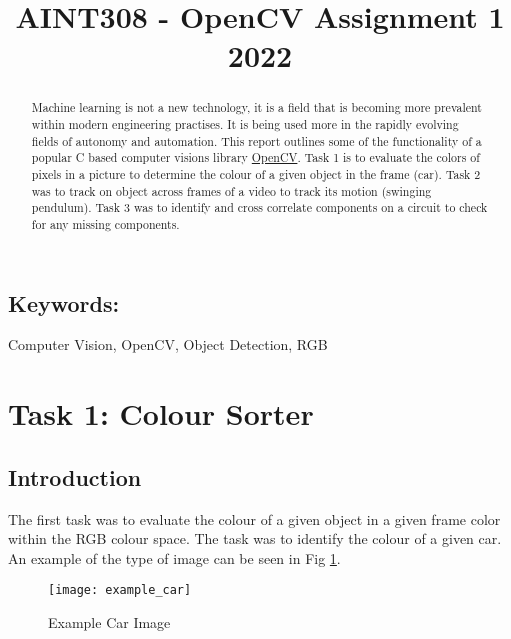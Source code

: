 \documentclass[conference]{IEEEtran}
\begin{document}
\title{AINT308 - OpenCV Assignment 1 2022}

\author{
}

\maketitle

\begin{abstract}

Machine learning is not a new technology, it is a field that is becoming more prevalent within modern engineering practises. It is being used more in the rapidly evolving fields of autonomy and automation. This report outlines some of the functionality of a popular C based computer visions library \href{https://opencv.org}{OpenCV}. Task 1 is to evaluate the colors of pixels in a picture to determine the colour of a given object in the frame (car). Task 2 
was to track on object across frames of a video to track its motion (swinging pendulum). Task 3 was to identify and cross correlate components on a circuit to check for any missing components.

\end{abstract}

\subsection*{Keywords:} 
Computer Vision, OpenCV, Object Detection, RGB\\

\section{Task 1: Colour Sorter}	
\subsection{Introduction}
The first task was to evaluate the colour of a given object in a given frame color within the RGB colour space. 
The task was to identify the colour of a given car. An example of the type of image can be seen in Fig \ref{fig:example_car}.

\begin{figure}[H]
\centerline{\texttt{[image: example\_car]}}
\caption{Example Car Image}
\label{fig:example_car}
\end{figure}
\end{document}
